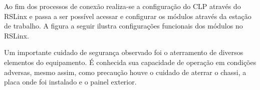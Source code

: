 \begin{table}[!ht]
	\caption{IPs dos dispositivos}
	\label{tabIPs}
	\small
	\centering
\end{table}

Ao fim dos processos de conexão realiza-se a configuração do CLP através do RSLinx e passa a ser possível acessar e configurar os módulos através da estação de trabalho. A figura a seguir ilustra configurações funcionais dos módulos no RSLinx.

Um importante cuidado de segurança observado foi o aterramento de diversos elementos do equipamento. É conhecida sua capacidade de operação em condições adversas, mesmo assim, como precaução houve o cuidado de aterrar o chassi, a placa onde foi instalado e o painel exterior.


%

